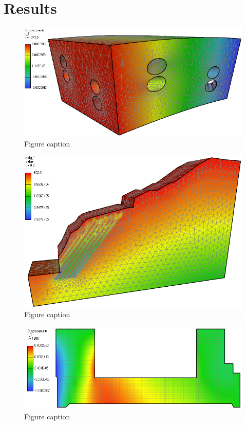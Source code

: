 \section{Results}
\label{section:results}

\begin{figure}[ht]
\centering\includegraphics[width=\textwidth]{figures/temelin_screenshot}
\caption{Figure caption}
\end{figure}

\begin{figure}[ht]
\centering\includegraphics[width=\textwidth]{figures/chotkova_screenshot}
\caption{Figure caption}
\end{figure}

\begin{figure}[ht]
\centering\includegraphics[width=\textwidth]{figures/mechaxisym_screenshot}
\caption{Figure caption}
\end{figure}

